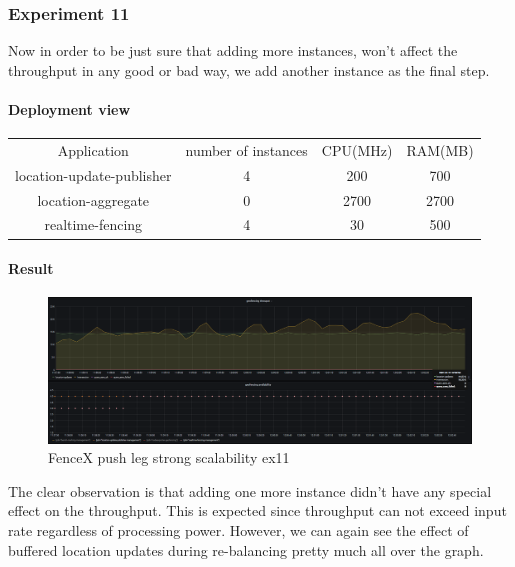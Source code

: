 \documentclass[a4]{report}
\begin{document}
        \subsubsection{Experiment 11}
        Now in order to be just sure that adding more instances, won't affect the throughput in any good or bad way, we
        add another instance as the final step.

        \paragraph{Deployment view}
        \begin{center}
            \begin{tabular}{ c c c c }
                Application               & number of instances & CPU(MHz) & RAM(MB) \\
                location-update-publisher & 4                   & 200      & 700     \\
                location-aggregate        & 0                   & 2700     & 2700    \\
                realtime-fencing          & 4                   & 30       & 500     \\
            \end{tabular}
        \end{center}

        \paragraph{Result}
        \begin{figure}[ht]
            \caption{FenceX push leg strong scalability ex11}
            \label{fig:ex11}
            \includegraphics[scale=0.4]{images/evaluation/ex11-benchmarking-ongoing-2per4sec.png}
        \end{figure}
        The clear observation is that adding one more instance didn't have any special effect on the throughput.
        This is expected since throughput can not exceed input rate regardless of processing power.
        However, we can again see the effect of buffered location updates during re-balancing pretty much all over the
        graph.
\end{document}
